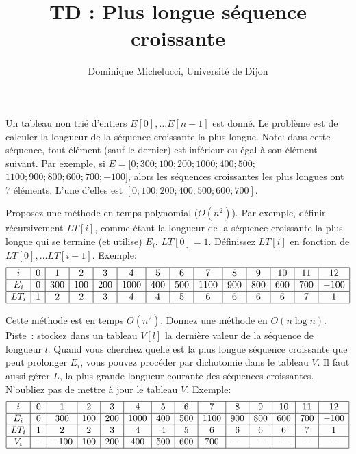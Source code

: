 \documentclass[a4paper]{article}
\begin{document}
\title{TD : Plus longue s\'equence croissante}
\author{Dominique Michelucci, Universit\'e de Dijon}
\maketitle

Un tableau non tri\'e d'entiers $E[0], \ldots E[n-1]$  est donn\'e.
Le probl\`eme est de calculer la longueur de la s\'equence croissante la plus longue.
Note: dans cette s\'equence, tout \'el\'ement (sauf le dernier) 
est inf\'erieur ou \'egal \`a  son \'el\'ement suivant.
Par exemple, si  $E=[0; 300; 100; 200; 1000; 400; 500;$ $ 1100; 900; 800; 600; 700; -100]$, alors
les s\'equences croissantes les plus longues ont 7 \'el\'ements.
L'une d'elles est $[0; 100; 200; 400; 500; 600; 700]$.

Proposez une m\'ethode en temps polynomial ($O(n^2)$). Par exemple, d\'efinir r\'ecursivement $LT[i]$, comme \'etant la longueur 
de la s\'equence croissante la plus longue qui se termine (et utilise) $E_i$. 
$LT[0]=1$. D\'efinissez $LT[i]$ en fonction de $LT[0], \ldots LT[i-1]$.
Exemple:
$$
\begin{array}{|c|c|c|c|c|c|c|c|c|c|c|c|c|c|}
\hline
i & 0 & 1 & 2 & 3 & 4 & 5 & 6 & 7 & 8 & 9 & 10 & 11 & 12  \\
\hline
E_i & 0 & 300 & 100 & 200 & 1000 & 400 & 500 & 1100 & 900 & 800 & 600 & 700 & -100 \\
\hline
LT_i & 1 & 2 & 2 & 3 & 4 & 4 & 5 & 6 & 6 & 6 & 6 &  7 & 1 \\
\hline
\end{array}
$$

Cette m\'ethode est en temps $O(n^2)$. Donnez une m\'ethode en $O(n\log n)$. Piste~: stockez dans un tableau
$V[l]$ la derni\`ere valeur de la s\'equence de longueur $l$. Quand vous cherchez quelle est la plus longue s\'equence croissante
que peut prolonger $E_i$, vous pouvez proc\'eder par dichotomie dans le tableau $V$. Il faut aussi g\'erer $L$, la plus grande 
longueur courante des s\'equences croissantes. N'oubliez pas de mettre \`a jour le tableau $V$.
Exemple: 
$$ 
\begin{array}{|c|c|c|c|c|c|c|c|c|c|c|c|c|c|}
\hline
i & 0 & 1 & 2 & 3 & 4 & 5 & 6 & 7 & 8 & 9 & 10 & 11 & 12  \\
\hline
E_i & 0 & 300 & 100 & 200 & 1000 & 400 & 500 & 1100 & 900 & 800 & 600 & 700 & -100 \\
\hline
LT_i & 1 & 2 & 2 & 3 & 4 & 4 & 5 & 6 & 6 & 6 & 6 & 7 & 1 \\
\hline
V_i & - & -100 & 100 & 200 & 400 & 500 & 600 & 700 & - & - & - & - & - \\
\hline
\end{array}
$$
\end{document}
